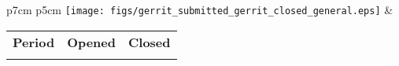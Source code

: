 \begin{tabular}{p{7cm} p{5cm}}
	\vspace{0pt} 
	\texttt{[image: figs/gerrit\_submitted\_gerrit\_closed\_general.eps]}
	& 
	\vspace{0pt}
	\begin{tabular}{l|r|r|}%
		\bfseries Period & \bfseries Opened & \bfseries Closed %
		\csvreader[head to column names]{data/gerrit_submitted_gerrit_closed_general.csv}{}%
		{\\ & \submitted & \closed}
	\end{tabular}
\end{tabular}